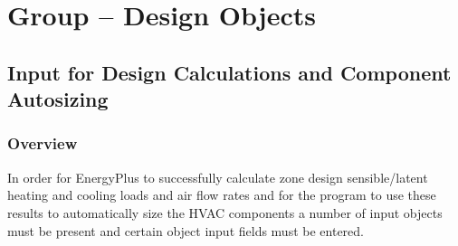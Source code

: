 \section{Group -- Design Objects}\label{group-design-objects}

\subsection{Input for Design Calculations and Component Autosizing}\label{input-for-design-calculations-and-component-autosizing}

\subsubsection{Overview}\label{overview-000}

In order for EnergyPlus to successfully calculate zone design sensible/latent heating and cooling loads and air flow rates and for the program to use these results to automatically size the HVAC components a number of input objects must be present and certain object input fields must be entered.

